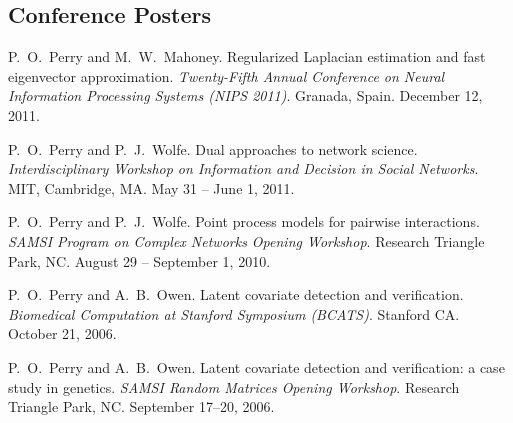 \documentclass[10pt,letterpaper]{article}
\renewenvironment{itemize}{
  \begin{list}{}{
    \setlength{\leftmargin}{1.5em}
    \setlength{\itemsep}{0.25em}
    \setlength{\parskip}{0pt}
    \setlength{\parsep}{0.25em}
  }
}{
  \end{list}
}
\begin{document}
\subsection*{Conference Posters}
\begin{itemize}
\item P.~O.~Perry and M.~W.~Mahoney.
  Regularized Laplacian estimation and fast eigenvector approximation.
  \textit{Twenty-Fifth Annual Conference on Neural Information Processing Systems (NIPS 2011)}.
  Granada, Spain.
  December 12, 2011.

\item P.~O.~Perry and P.~J.~Wolfe.
  Dual approaches to network science.
  \textit{Interdisciplinary Workshop on Information and Decision in Social Networks}.
  MIT, Cambridge, MA.
  May 31 -- June 1, 2011.

\item P.~O.~Perry and P.~J.~Wolfe.
  Point process models for pairwise interactions.
  \textit{SAMSI Program on Complex Networks Opening Workshop}.
  Research Triangle Park, NC.
  August 29 -- September 1, 2010.

\item P.~O.~Perry and A.~B.~Owen.
  Latent covariate detection and verification.
  \textit{Biomedical Computation at Stanford Symposium (BCATS)}.
  Stanford CA.
  October 21, 2006.

\item P.~O.~Perry and A.~B.~Owen.
  Latent covariate detection and verification: a case study in genetics.
  \textit{SAMSI Random Matrices Opening Workshop}.
  Research Triangle Park, NC.
  September 17--20, 2006.
\end{itemize}
\end{document}
